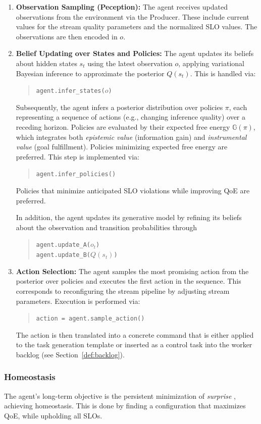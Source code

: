\begin{enumerate}
    \item \textbf{Observation Sampling (Peception):} The agent receives updated observations from the environment via the Producer. These include current values for the stream quality parameters and the normalized SLO values. The observations are then encoded in \(o\).

    \item \textbf{Belief Updating over States and Policies:} The agent updates its beliefs about hidden states \(s_t\) using the latest observation \(o\), applying variational Bayesian inference to approximate the posterior \(Q(s_t)\). This is handled via:
    \begin{quote}
        \texttt{agent.infer\_states(\(o\))}
    \end{quote}
    Subsequently, the agent infers a posterior distribution over policies $\pi$, each representing a sequence of actions (e.g., changing inference quality) over a receding horizon. Policies are evaluated by their expected free energy $\mathbb{G}(\pi)$, which integrates both \emph{epistemic value} (information gain) and \emph{instrumental value} (goal fulfillment). Policies minimizing expected free energy are preferred. This step is implemented via:
    \begin{quote}
        \texttt{agent.infer\_policies()}
    \end{quote}
     Policies that minimize anticipated SLO violations while improving QoE are preferred.

     In addition, the agent updates its generative model by refining its beliefs about the observation and transition probabilities through
    \begin{quote}
        \texttt{agent.update\_A(\(o_t\))} \\
        \texttt{agent.update\_B(\(Q(s_t)\))}
    \end{quote}
    
    \item \textbf{Action Selection:} The agent samples the most promising action from the posterior over policies and executes the first action in the sequence. This corresponds to reconfiguring the stream pipeline by adjusting stream parameters. Execution is performed via:
    \begin{quote}
        \texttt{action = agent.sample\_action()}
    \end{quote}
    The action is then translated into a concrete command that is either applied to the task generation template or inserted as a control task into the worker backlog (see Section~\ref{def:backlog}).
\end{enumerate}

\subsubsection{Homeostasis}
The agent's long-term objective is the persistent minimization of \textit{surprise} \cite{sedlak_adaptive_2024}, achieving homeostasis. This is done by finding a configuration that maximizes QoE, while upholding all SLOs.